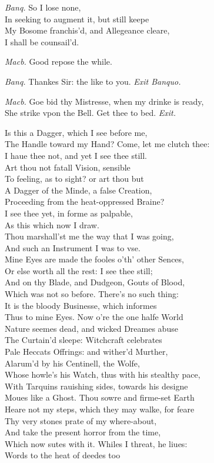 \documentclass[12pt]{sides}
\newcommand{\clStageDir}[1]{\hspace*{\fill}\textit{#1}\hspace*{\fill}}
\newcommand{\elStageDir}[1]{\hfill\textit{#1}}
\newcommand{\dia}[1]{\hskip 15pt\textit{#1}\hskip 6pt}
\begin{document}
\begin{multicols}{2}
            \dia{Banq.} So I lose none, \\ In seeking to augment it, but still keepe \\ My Bosome franchis'd, and Allegeance cleare, \\ I shall be counsail'd.

            \dia{Macb.} Good repose the while.

            \dia{Banq.} Thankes Sir: the like to you. \clStageDir{Exit Banquo.}

            \dia{Macb.} Goe bid thy Mistresse, when my drinke is ready, \\ She strike vpon the Bell. Get thee to bed. \elStageDir{Exit.} \hspace{16pt}
            
            Is this a Dagger, which I see before me, \\ The Handle toward my Hand? Come, let me clutch thee: \\ I haue thee not, and yet I see thee still. \\ Art thou not fatall Vision, sensible \\ To feeling, as to sight? or art thou but \\ A Dagger of the Minde, a false Creation, \\ Proceeding from the heat-oppressed Braine? \\ I see thee yet, in forme as palpable, \\ As this which now I draw. \\ Thou marshall'st me the way that I was going, \\ And such an Instrument I was to vse. \\ Mine Eyes are made the fooles o'th' other Sences, \\ Or else worth all the rest: I see thee still; \\ And on thy Blade, and Dudgeon, Gouts of Blood, \\ Which was not so before. There's no such thing: \\ It is the bloody Businesse, which informes \\ Thus to mine Eyes. Now o're the one halfe World \\ Nature seemes dead, and wicked Dreames abuse \\ The Curtain'd sleepe: Witchcraft celebrates \\ Pale Heccats Offrings: and wither'd Murther, \\ Alarum'd by his Centinell, the Wolfe, \\ Whose howle's his Watch, thus with his stealthy pace, \\ With Tarquins rauishing sides, towards his designe \\ Moues like a Ghost. Thou sowre and firme-set Earth \\ Heare not my steps, which they may walke, for feare \\ Thy very stones prate of my where-about, \\ And take the present horror from the time, \\ Which now sutes with it. Whiles I threat, he liues: \\ Words to the heat of deedes too 
\end{multicols}
\end{document}
